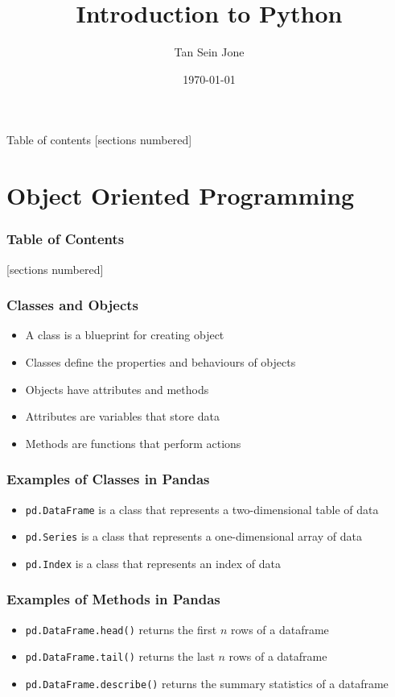 \documentclass[serif, 9pt, aspectratio=32]{beamer}
\title{Introduction to Python}
\date{\today}
\author{Tan Sein Jone}
\institute{University of British Columbia}
\begin{document}
\maketitle

\begin{frame}{Table of contents}
    [sections numbered]
    \tableofcontents[hideallsubsections]
\end{frame}

\section{Object Oriented Programming}

\begin{frame}
    \frametitle{Table of Contents}
    [sections numbered]
    \tableofcontents[currentsection]
\end{frame}

\begin{frame}
    \centering
    \frametitle{Classes and Objects}
    \begin{itemize}
        \setlength{\itemsep}{2em}
        \item A class is a blueprint for creating object
        \item Classes define the properties and behaviours of objects
        \item Objects have attributes and methods
        \item Attributes are variables that store data
        \item Methods are functions that perform actions
    \end{itemize}
\end{frame}

\begin{frame}
    \centering
    \frametitle{Examples of Classes in Pandas}
    \begin{itemize}
        \setlength{\itemsep}{2em}
        \item \texttt{pd.DataFrame} is a class that represents a two-dimensional table of data
        \item \texttt{pd.Series} is a class that represents a one-dimensional array of data
        \item \texttt{pd.Index} is a class that represents an index of data
    \end{itemize}
\end{frame}

\begin{frame}
    \centering
    \frametitle{Examples of Methods in Pandas}
    \begin{itemize}
        \setlength{\itemsep}{2em}
        \item \texttt{pd.DataFrame.head()} returns the first $n$ rows of a dataframe
        \item \texttt{pd.DataFrame.tail()} returns the last $n$ rows of a dataframe
        \item \texttt{pd.DataFrame.describe()} returns the summary statistics of a dataframe
    \end{itemize}
\end{frame}
\end{document}
